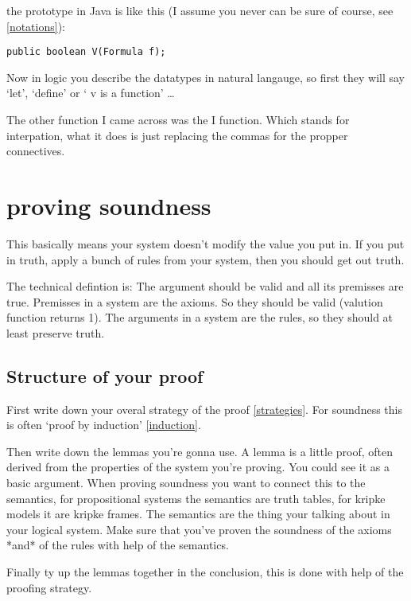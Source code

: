 \documentclass{article}
\begin{document}
the prototype in Java is like this (I assume you never can be sure of course,
see \autoref{notations}):


\begin{lstlisting}[frame=single] 
	public boolean V(Formula f);
\end{lstlisting}

Now in logic you describe the datatypes in natural langauge, so first they will
say `let', `define' or ` v is a function' \ldots

The other function I came across was the I function. Which stands for 
interpation, what it does is just replacing the commas for the propper
connectives.

\section{proving soundness}
This basically means your system doesn't modify the value you put in.
If you put in truth, apply a bunch of rules from your system, then you should
get out truth.

The technical defintion is: The argument should be valid and all
its premisses are true. Premisses in a system are the axioms.
So they should be valid (valution function returns 1). The arguments
in a system are the rules, so they should at least preserve truth.

\subsection{Structure of your proof}
First write down your overal strategy of the proof \autoref{strategies}. For
soundness this is often `proof by induction' \autoref{induction}.

Then write down the lemmas you're gonna use. A lemma is a little proof, often
derived from the properties of the system you're proving. You could see it
as a basic argument. When proving soundness you want to connect this to the
semantics, for propositional systems the semantics are truth tables, for kripke
models it are kripke frames. The semantics are the thing your talking about
in your logical system.
Make sure that you've proven the soundness of the axioms *and* of the rules
with help of the semantics.

Finally ty up the lemmas together in the conclusion, this is done with help
of the proofing strategy.
\end{document}
